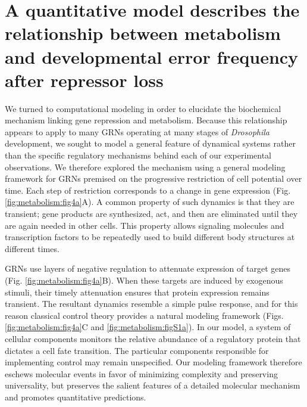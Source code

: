 \section{A quantitative model describes the relationship between metabolism and developmental error frequency after repressor loss}

We turned to computational modeling in order to elucidate the biochemical mechanism linking gene repression and metabolism. Because this relationship appears to apply to many GRNs operating at many stages of \textit{Drosophila} development, we sought to model a general feature of dynamical systems rather than the specific regulatory mechanisms behind each of our experimental observations. We therefore explored the mechanism using a general modeling framework for GRNs premised on the progressive restriction of cell potential over time. Each step of restriction corresponds to a change in gene expression (Fig. \ref{fig:metabolism:fig4a}A). A common property of such dynamics is that they are transient; gene products are synthesized, act, and then are eliminated until they are again needed in other cells. This property allows signaling molecules and transcription factors to be repeatedly used to build different body structures at different times.

GRNs use layers of negative regulation to attenuate expression of target genes (Fig. \ref{fig:metabolism:fig4a}B). When these targets are induced by exogenous stimuli, their timely attenuation ensures that protein expression remains transient. The resultant dynamics resemble a simple pulse response, and for this reason classical control theory provides a natural modeling framework (Figs. \ref{fig:metabolism:fig4a}C and \ref{fig:metabolism:figS1a}). In our model, a system of cellular components monitors the relative abundance of a regulatory protein that dictates a cell fate transition. The particular components responsible for implementing control may remain unspecified. Our modeling framework therefore eschews molecular events in favor of minimizing complexity and preserving universality, but preserves the salient features of a detailed molecular mechanism and promotes quantitative predictions.

